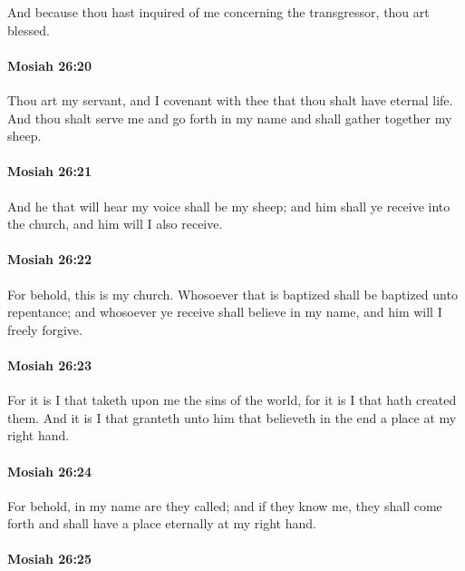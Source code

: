			And because thou hast inquired of me concerning the transgressor,
			thou art blessed.

		\paragraph{Mosiah 26:20} %
			\label{MOSIAH-26-20}

			Thou art my servant,
			and I covenant with thee that thou shalt have eternal life.
			And thou shalt serve me and go forth in my name
			and shall gather together my sheep.

		\paragraph{Mosiah 26:21} %
			\label{MOSIAH-26-21}

			And he that will hear my voice shall be my sheep;
			and him shall ye receive into the church,
			and him will I also receive.

		\paragraph{Mosiah 26:22} %
			\label{MOSIAH-26-22}

			For behold, this is my church.
			Whosoever that is baptized shall be baptized unto repentance;
			and whosoever ye receive shall believe in my name,
			and him will I freely forgive.

		\paragraph{Mosiah 26:23} %
			\label{MOSIAH-26-23}

			For it is I that taketh upon me the sins of the world,
			for it is I that hath created them.
			And it is I that granteth unto him that believeth
			in the end a place at my right hand.

		\paragraph{Mosiah 26:24} %
			\label{MOSIAH-26-24}

			For behold, in my name are they called;
			and if they know me,
			they shall come forth and shall have a place eternally at my right hand.

		\paragraph{Mosiah 26:25} %
			\label{MOSIAH-26-25}

